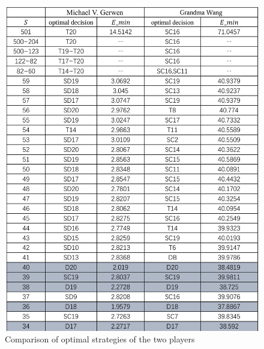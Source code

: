 \documentclass[cjjs]{ipart}
\theoremstyle{plain}
\begin{document}
\begin{spacing}{1.0}
\begin{figure}[H]
    \centering
    \begin{minipage}{0.45\textwidth}  
        \centering
        \includegraphics[width=\textwidth]{picture1.png}  
        \caption{Comparison of optimal strategies of the two players}  
        \label{fig:image1}
    \end{minipage} \hspace{0.5cm} 
    \begin{minipage}{0.45\textwidth} 
        \centering

\end{minipage}
\end{figure}
\end{spacing}
\end{document}
